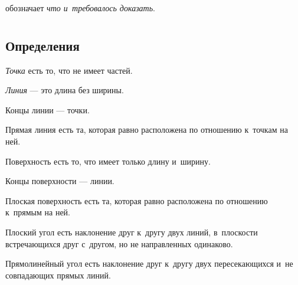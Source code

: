 \documentclass[letters,booklanguage=russian]{byrnebook}
\begin{document}
\symb{\qedstr}
 обозначает \emph{что и~требовалось доказать}.
 
 \part{}
 
 
\chapter*{Определения}

\startdefinition{}
\begin{center}
\emph{Точка} есть то, что не имеет частей.
\end{center}

\startdefinition{}
\begin{center}
\emph{Линия} — это длина без ширины.
\end{center}

\startdefinition{}
\begin{center}
Концы линии — точки.
\end{center}

\startdefinition{}
\begin{center}
Прямая линия есть та, которая равно расположена по отношению к~точкам на ней.
\end{center}

\startdefinition{}
\begin{center}
Поверхность есть то, что имеет только длину и~ширину.
\end{center}

\startdefinition{}
\begin{center}
Концы поверхности — линии.
\end{center}

\startdefinition{}
\begin{center}
Плоская поверхность есть та, которая равно расположена по отношению к~прямым на ней.
\end{center}

\startdefinition{}
\begin{center}
Плоский угол есть наклонение друг к~другу двух линий, в~плоскости встречающихся друг с~другом, но не направленных одинаково.
\end{center}

\startdefinition{}
\begin{center}
\drawCurrentPictureInMargin[inside] Прямолинейный угол есть наклонение друг к~другу двух пересекающихся и~не совпадающих прямых линий.
\end{center}
\end{document}
